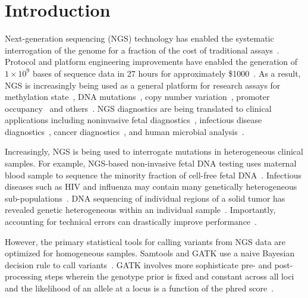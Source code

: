 \documentclass{bioinfo}
\begin{document}
\section{Introduction}
\label{sec:intro}
Next-generation sequencing (NGS) technology has enabled the systematic interrogation of the genome for a fraction of the cost of traditional assays~\citep{Koboldt:2013kw}. Protocol and platform engineering improvements have enabled the generation of $1\times10^9$ bases of sequence data in 27 hours for approximately \$1000~\citep{Quail:2012hf}. As a result, NGS is increasingly being used as a general platform for research assays for methylation state~\citep{Laird:2010ab}, DNA mutations~\citep{Consortium:2013co}, copy number variation~\citep{Alkan:2009cr}, promoter occupancy~\citep{Ouyang:2009hc} and others~\citep{Rivera:2013ee}. NGS diagnostics are being translated to clinical applications including noninvasive fetal diagnostics~\citep{Kitzman:2012hea}, infectious disease diagnostics~\citep{Capobianchi:2012em}, cancer diagnostics~\citep{Navin:2010gu}, and human microbial analysis~\citep{Consortium:2013iz}.

Increasingly, NGS is being used to interrogate mutations in heterogeneous clinical samples. For example, NGS-based non-invasive fetal DNA testing uses maternal blood sample to sequence the minority fraction of cell-free fetal DNA~\citep{Fan:2008di}. Infectious diseases such as HIV and influenza may contain many genetically heterogeneous sub-populations~\citep{Flaherty:2011ja, Ghedin:2010ie}. DNA sequencing of individual regions of a solid tumor has revealed genetic heterogeneous within an individual sample~\citep{Navin:2010gu}. Importantly, accounting for technical errors can drastically improve performance~\citep{zagordi2010error}.

However, the primary statistical tools for calling variants from NGS data are optimized for homogeneous samples. Samtools and GATK use a naive Bayesian decision rule to call variants~\citep{li2011statistical, depristo2011framework}. GATK involves more sophisticate pre- and post-processing steps wherein the genotype prior is fixed and constant across all loci and the likelihood of an allele at a locus is a function of the phred score~\citep{McKenna:2010bv}.
\end{document}
